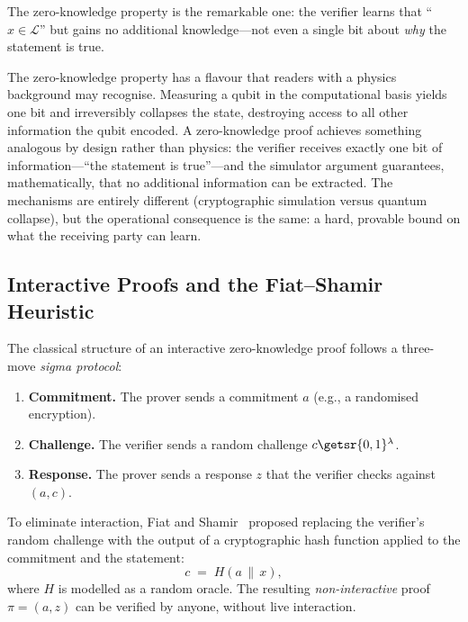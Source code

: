 The zero-knowledge property is the remarkable one: the verifier learns that ``$x \in \mathcal{L}$'' but gains no additional knowledge---not even a single bit about \emph{why} the statement is true.

The zero-knowledge property has a flavour that readers with a physics background may recognise.  Measuring a qubit in the computational basis yields one bit and irreversibly collapses the state, destroying access to all other information the qubit encoded.  A zero-knowledge proof achieves something analogous by design rather than physics: the verifier receives exactly one bit of information---``the statement is true''---and the simulator argument guarantees, mathematically, that no additional information can be extracted.  The mechanisms are entirely different (cryptographic simulation versus quantum collapse), but the operational consequence is the same: a hard, provable bound on what the receiving party can learn.


\subsection{Interactive Proofs and the Fiat--Shamir Heuristic}
\label{subsec:fiat-shamir}

The classical structure of an interactive zero-knowledge proof follows a three-move \emph{sigma protocol}:

\begin{enumerate}
\item \textbf{Commitment.} The prover sends a commitment $a$ (e.g., a randomised encryption).
\item \textbf{Challenge.} The verifier sends a random challenge $c \getsr \{0,1\}^\lambda$.
\item \textbf{Response.} The prover sends a response $z$ that the verifier checks against $(a, c)$.
\end{enumerate}

To eliminate interaction, Fiat and Shamir~\cite{FiatShamir1986} proposed replacing the verifier's random challenge with the output of a cryptographic hash function applied to the commitment and the statement:
\begin{equation}
\label{eq:fiat-shamir}
c \;=\; H(a \,\|\, x),
\end{equation}
where $H$ is modelled as a random oracle.  The resulting \emph{non-interactive} proof $\pi = (a, z)$ can be verified by anyone, without live interaction.

